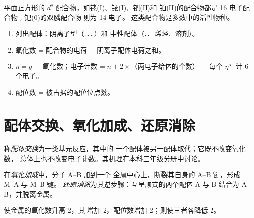 平面正方形的 $d^8$ 配合物，如铑(I)、铱(I)、钯(II)和
铂(II)的配合物都是 16 电子配合物；钯(0)的双膦配合物  则为 14 电子。
这类配合物是多数中的活性物种。

\begin{method}[有机金属配合物的计数]\label{met:b2:catalytic-cycles:count-organometallic}
\begin{enumerate}
  \item 列出配体：阴离子型（、、、）和
        中性配体（、、烯烃、溶剂）。
  \item 氧化数 = 配合物的电荷 $-$ 阴离子配体电荷之和。
  \item $n = g -$ 氧化数；电子计数 = $n + 2 \times$（两电子给体的个数）
        $+$ 每个 $\eta^5$- 计 6 个电子。
  \item 配位数 = 被占据的配位位点数。
\end{enumerate}
\end{method}

\section{配体交换、氧化加成、还原消除}

\begin{definition}[配体交换]\label{def:b2:catalytic-cycles:ligand-exchange}
称\emph{配体交换}为一类基元反应，其中的
一个配体被另一配体取代；它既不改变氧化数，
总体上也不改变电子计数。其机理在本科三年级分册中讨论。
\end{definition}

\begin{definition}[氧化加成与还原消除]\label{def:b2:catalytic-cycles:oxidative-addition}
在\emph{氧化加成}中，分子 A--B 加到一个
金属中心上，断裂其自身的 A--B 键，形成 M--A 与 M--B 键。
\emph{还原消除}为其逆步骤：互呈顺式的两个配体 A 与 B
结合为 A--B，并脱离金属。
\end{definition}

\begin{proposition}[氧化加成的计数]\label{prop:b2:catalytic-cycles:oa}
使金属的氧化数升高 2，其
增加 2，配位数增加 2；则使三者各降低 2。
\end{proposition}

